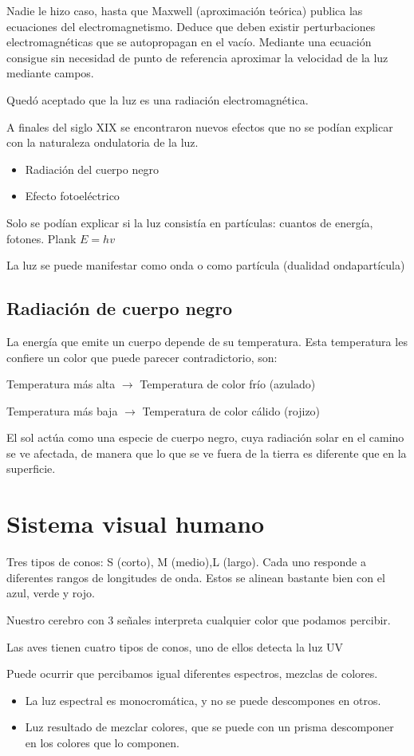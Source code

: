 Nadie le hizo caso, hasta que Maxwell (aproximación teórica) publica las ecuaciones del electromagnetismo. Deduce que deben existir perturbaciones electromagnéticas que se autopropagan en el vacío. Mediante una ecuación consigue sin necesidad de punto de referencia aproximar la velocidad de la luz mediante campos.

Quedó aceptado que la luz es una radiación electromagnética.

A finales del siglo XIX se encontraron nuevos efectos que no se podían explicar con la naturaleza ondulatoria de la luz.
\begin{itemize}
    \item Radiación del cuerpo negro
    \item Efecto fotoeléctrico
\end{itemize}

Solo se podían explicar si la luz consistía en partículas: cuantos de energía, fotones. Plank $E=hv$

La luz se puede manifestar como onda o como partícula (dualidad ondapartícula)

\subsection{Radiación de cuerpo negro}
La energía que emite un cuerpo depende de su temperatura. Esta temperatura les confiere un color que puede parecer contradictorio, son:

Temperatura más alta $\rightarrow$ Temperatura de color frío (azulado)

Temperatura más baja $\rightarrow$ Temperatura de color cálido (rojizo)

El sol actúa como una especie de cuerpo negro, cuya radiación solar en el camino se ve afectada, de manera que lo que se ve fuera de la tierra es diferente que en la superficie.

\section{Sistema visual humano}
Tres tipos de conos: S (corto), M (medio),L (largo). Cada uno responde a diferentes rangos de longitudes de onda. Estos se alinean bastante bien con el azul, verde y rojo.

Nuestro cerebro con 3 señales interpreta cualquier color que podamos percibir.

Las aves tienen cuatro tipos de conos, uno de ellos detecta la luz UV

Puede ocurrir que percibamos igual diferentes espectros, mezclas de colores.
\begin{itemize}
    \item La luz espectral es monocromática, y no se puede descompones en otros.
    \item Luz resultado de mezclar colores, que se puede con un prisma descomponer en los colores que lo componen.
\end{itemize}


